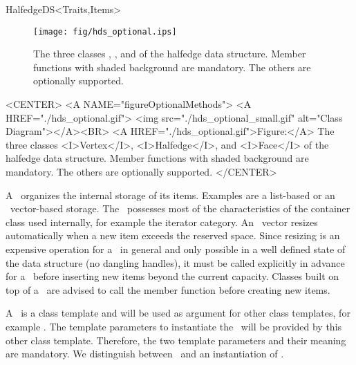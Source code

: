 \begin{ccRefConcept}{HalfedgeDS<Traits,Items>}
\begin{ccTexOnly}
    \begin{figure}[bht]
        \begin{center}
          \parbox{\textwidth}{%
              \texttt{[image: fig/hds\_optional.ips]}%
          }
        \end{center}
        \caption{The three classes \protect{}, 
          \protect{}, and 
          \protect{} of the halfedge data structure. Member
          functions with shaded background are mandatory. The others
          are optionally supported.}
        \label{figureOptionalMethods}
    \end{figure}
\end{ccTexOnly}

\begin{ccHtmlOnly}
    <CENTER>
    <A NAME="figureOptionalMethods">
    <A HREF="./hds_optional.gif">
        <img src="./hds_optional_small.gif" 
             alt="Class Diagram"></A><BR>
    <A HREF="./hds_optional.gif">Figure:</A>
    The three classes <I>Vertex</I>, <I>Halfedge</I>, and 
          <I>Face</I> of the halfedge data structure. Member
          functions with shaded background are mandatory. The others
          are optionally supported.
    </CENTER>
\end{ccHtmlOnly}

A \ccRefName\ organizes the internal storage of its items.  Examples
are a list-based or an \stl\ vector-based storage. The \ccRefName\ 
possesses most of the characteristics of the container class used
internally, for example the iterator category. An \stl\ vector resizes
automatically when a new item exceeds the reserved space. Since
resizing is an expensive operation for a \ccRefName\ in general and
only possible in a well defined state of the data structure (no
dangling handles), it must be called explicitly in advance for a
\ccRefName\ before inserting new items beyond the current capacity.
Classes built on top of a \ccRefName\ are advised to call the
 member function before creating new items.

\ccParameters

A \ccRefName\ is a class template and will be used as argument for
other class templates, for example \ccc{CGAL::Polyhedron_3}. The
template parameters to instantiate the \ccRefName\ will be provided by
this other class template. Therefore, the two template parameters and
their meaning are mandatory. We distinguish between \ccRefName\ and 
an instantiation of \ccRefName.


\end{ccRefConcept}
